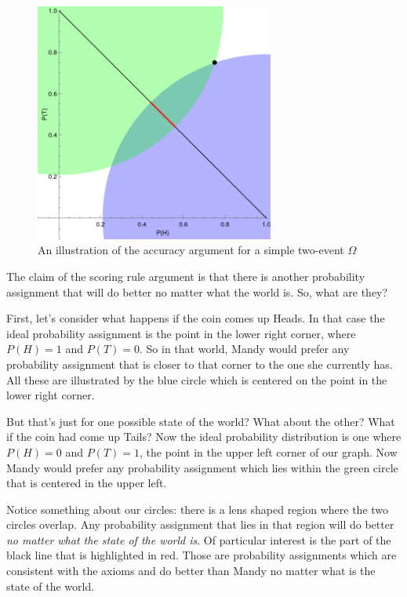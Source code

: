 \begin{figure}
\centering
\includegraphics[width=0.7\textwidth]{Scoring rule graph.png}
\medskip
\caption{An illustration of the accuracy argument for a simple two-event $\Omega$}
\label{f:scoringrule}
\end{figure}

The claim of the scoring rule argument is that there is another probability assignment that will do better no matter what the world is.  So, what are they?  

First, let's consider what happens if the coin comes up Heads.  In that case the ideal probability assignment is the point in the lower right corner, where $P(H) = 1$ and $P(T) = 0$.  So in that world, Mandy would prefer any probability assignment that is closer to that corner to the one she currently has.  All these are illustrated by the blue circle which is centered on the point in the lower right corner.

But that's just for one possible state of the world?  What about the other?  What if the coin had come up Tails?  Now the ideal probability distribution is one where $P(H) = 0$ and $P(T) = 1$, the point in the upper left corner of our graph.  Now Mandy would prefer any probability assignment which lies within the green circle that is centered in the upper left.

Notice something about our circles: there is a lens shaped region where the two circles overlap.  Any probability assignment that lies in that region will do better {\it no matter what the state of the world is}.  Of particular interest is the part of the black line that is highlighted in red.  Those are probability assignments which are consistent with the axioms and do better than Mandy no matter what is the state of the world.

